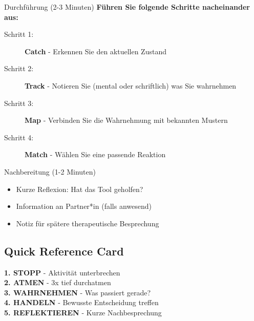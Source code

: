 \begin{ctmmGreenBox}{Durchführung (2-3 Minuten)}
\textbf{Führen Sie folgende Schritte nacheinander aus:}

\begin{description}
    \item[Schritt 1:] \textcolor{ctmmBlue}{\textbf{Catch}} - Erkennen Sie den aktuellen Zustand
    \item[Schritt 2:] \textcolor{ctmmOrange}{\textbf{Track}} - Notieren Sie (mental oder schriftlich) was Sie wahrnehmen
    \item[Schritt 3:] \textcolor{ctmmPurple}{\textbf{Map}} - Verbinden Sie die Wahrnehmung mit bekannten Mustern
    \item[Schritt 4:] \textcolor{ctmmGreen}{\textbf{Match}} - Wählen Sie eine passende Reaktion
\end{description}
\end{ctmmGreenBox}

\vspace{0.5cm}

\begin{ctmmPurpleBox}{Nachbereitung (1-2 Minuten)}
\begin{itemize}
    \item Kurze Reflexion: Hat das Tool geholfen?
    \item Information an Partner*in (falls anwesend)
    \item Notiz für spätere therapeutische Besprechung
\end{itemize}
\end{ctmmPurpleBox}

\subsection{Quick Reference Card}

\begin{center}
\begin{tcolorbox}[colback=ctmmYellow!10, colframe=ctmmOrange, title=\textbf{5-4-3-2-1 Grounding Technik - Kurzanleitung}]
\textbf{1. STOPP} - Aktivität unterbrechen \\
\textbf{2. ATMEN} - 3x tief durchatmen \\
\textbf{3. WAHRNEHMEN} - Was passiert gerade? \\
\textbf{4. HANDELN} - Bewusste Entscheidung treffen \\
\textbf{5. REFLEKTIEREN} - Kurze Nachbesprechung
\end{tcolorbox}
\end{center}

